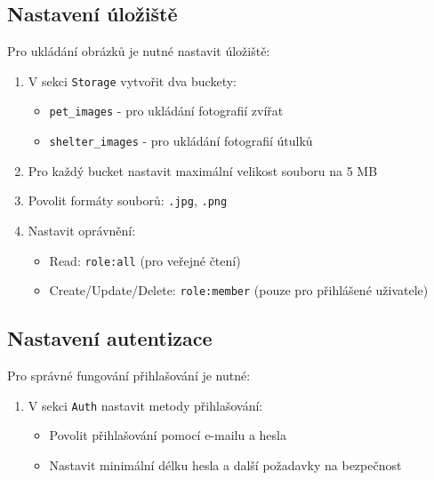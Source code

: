 \documentclass[czech, bp, kiv, he, iso690numb, pdf]{fasthesis}
\begin{document}
    \subsection{Nastavení úložiště}
    \label{subsec:storage-setup}

    Pro ukládání obrázků je nutné nastavit úložiště:

    \begin{enumerate}
        \item V sekci \texttt{Storage} vytvořit dva buckety:
        \begin{itemize}
            \item \texttt{pet\_images} - pro ukládání fotografií zvířat
            \item \texttt{shelter\_images} - pro ukládání fotografií útulků
        \end{itemize}
        \item Pro každý bucket nastavit maximální velikost souboru na 5 MB
        \item Povolit formáty souborů: \texttt{.jpg}, \texttt{.png}
        \item Nastavit oprávnění:
        \begin{itemize}
            \item Read: \texttt{role:all} (pro veřejné čtení)
            \item Create/Update/Delete: \texttt{role:member} (pouze pro přihlášené uživatele)
        \end{itemize}
    \end{enumerate}

    \subsection{Nastavení autentizace}
    \label{subsec:auth-setup}

    Pro správné fungování přihlašování je nutné:

    \begin{enumerate}
        \item V sekci \texttt{Auth} nastavit metody přihlašování:
        \begin{itemize}
            \item Povolit přihlašování pomocí e-mailu a hesla
            \item Nastavit minimální délku hesla a další požadavky na bezpečnost
        \end{itemize}

    \end{enumerate}
\end{document}
